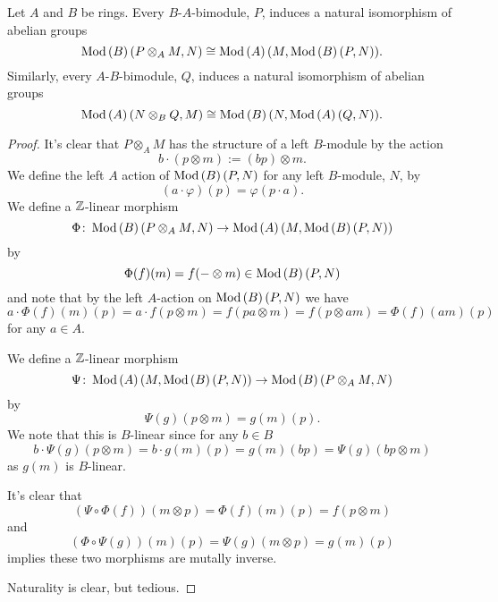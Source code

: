 \documentclass[reqno, 12pt]{amsart}
\begin{document}
\begin{proposition}
  Let $A$ and $B$ be rings.
  Every $B$-$A$-bimodule, $P$, induces a natural isomorphism of abelian groups
  $$\operatorname{Mod}\left(B\right)(P \otimes_A M, N) \cong \operatorname{Mod}\left(A\right)(M, \operatorname{Mod}\left(B\right)(P,N)).$$
  Similarly, every $A$-$B$-bimodule, $Q$, induces a natural isomorphism of abelian groups
  $$\operatorname{Mod}\left(A\right)(N \otimes_B Q, M) \cong \operatorname{Mod}\left(B\right)(N, \operatorname{Mod}\left(A\right)(Q,N)).$$
\end{proposition}
\begin{proof}
  It's clear that $P \otimes_A M$ has the structure of a left $B$-module by the action
  $$b \cdot (p \otimes m) := (bp) \otimes m.$$
  We define the left $A$ action of $\operatorname{Mod}\left(B\right)(P,N)$ for any left $B$-module, $N$, by 
  $$(a \cdot \varphi)(p) = \varphi(p \cdot a).$$
  We define a $\mathbb{Z}$-linear morphism
  $$\Phi \colon \operatorname{Mod}\left(B\right)(P \otimes_A M, N) \to \operatorname{Mod}\left(A\right)(M, \operatorname{Mod}\left(B\right)(P,N))$$
  by
  $$\Phi(f)(m) = f(- \otimes m) \in \operatorname{Mod}\left(B\right)(P,N)$$
  and note that by the left $A$-action on $\operatorname{Mod}\left(B\right)(P,N)$ we have
  $$a \cdot \Phi(f)(m)(p) = a \cdot f(p\otimes m) = f(pa \otimes m) = f(p \otimes am) = \Phi(f)(am)(p)$$
  for any $a \in A$.

  We define a $\mathbb{Z}$-linear morphism
  $$\Psi \colon \operatorname{Mod}\left(A\right)(M, \operatorname{Mod}\left(B\right)(P,N)) \to \operatorname{Mod}\left(B\right)(P \otimes_A M, N)$$
  by
  $$\Psi(g)(p \otimes m) = g(m)(p).$$
  We note that this is $B$-linear since for any $b \in B$
  $$b \cdot \Psi(g)(p \otimes m) = b \cdot g(m)(p) = g(m)(bp) = \Psi(g)(bp \otimes m)$$
  as $g(m)$ is $B$-linear.
  
  It's clear that
  $$\left(\Psi \circ \Phi(f)\right)(m \otimes p) = \Phi(f)(m)(p) = f(p \otimes m)$$
  and
  $$\left(\Phi \circ \Psi(g)\right)(m)(p) = \Psi(g)(m \otimes p) = g(m)(p)$$
  implies these two morphisms are mutally inverse.

  Naturality is clear, but tedious.
\end{proof}
\end{document}
